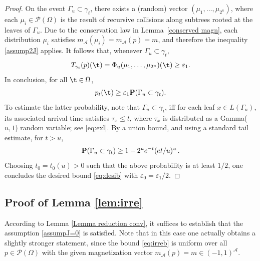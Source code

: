\documentclass[11pt,reqno]{amsart}
\numberwithin{equation}{section}
\numberwithin{figure}{section}
\renewcommand{\leq}{\le}%
\renewcommand{\geq}{\ge} %
\newcommand{\1}{\mathds{1}}
\let\e=\varepsilon \let\f=\varphi \let\l=\lambda
\let\O=\Omega
\let\G=\Gamma
\newcommand{\cA}{\ensuremath{\mathcal A}}
\newcommand{\cP}{\ensuremath{\mathcal P}}
\begin{document}
\begin{proof}
On the event \({\G_u} \subset \gamma_t\), there exists a (random) vector \( (\mu_1, \ldots, \mu_{2^{u}})\), where each \(\mu_i\in\cP(\O)\) is the result of recursive collisions along subtrees rooted at the leaves of 
\({\G_u}\). Due to the conservation law in Lemma~\ref{conserved magn}, each distribution \(\mu_i \) satisfies $m_\cA(\mu_i)=m_\cA(p)=m$, and therefore the inequality \eqref{assump2J} applies. It follows that, whenever $ {\G_u} \subset \gamma_t$, 
\begin{equation}
    T_{\gamma_t}(p)(\t) = \Phi_u(\mu_1,\dots,\mu_{2^u})(\t)\ge  \varepsilon_1.
\end{equation}
In conclusion, for all $\t\in\O$,
\begin{equation}
    p_t(\t) \geq \varepsilon_1 {\bf P}({\G_u}  \subset \gamma_t).
\end{equation}
To estimate the latter probability, note that ${\G_u}  \subset \gamma_t$, iff for each leaf \(x \in L(\G_u)\), its associated arrival time satisfies \(\tau_x \leq t\), where \(\tau_x\) is distributed as a Gamma(\(u, 1\)) random variable; see \eqref{eq:exl}. By a union bound, and using a standard tail estimate, for $t>u$, 
\begin{equation}
    {\bf P}({\G_u}  \subset \gamma_t) \geq 1-2^{u} e^{-t} (e t/u)^u \,.
\end{equation}
Choosing \(t_0 = t_0(u) > 0\) such that the above probability is at least $1/2$, one concludes the desired bound \eqref{eq:desib} with $\e_0=\e_1/2$.
\end{proof}

\subsection{Proof of Lemma \ref{lem:irre}}
According to Lemma \ref{Lemma reduction conv}, it suffices to establish that the assumption \eqref{assumpJ=0} is satisfied. Note that in this case one actually obtains a slightly stronger statement, since the bound \eqref{eq:irreb} is uniform over all $p\in\cP(\O)$ with the given magnetization vector $m_\cA(p)=m\in(-1,1)^\cA$. 
\end{document}
